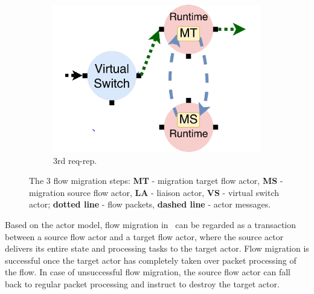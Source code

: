\begin{figure}[!t]
  \begin{subfigure}[t]{0.33\linewidth}
 \centering
   \includegraphics[width=1.1\columnwidth]{figure/nfactor-mig3.pdf}
   \caption{3rd req-rep.}\label{fig:mig3} \end{subfigure}\hfill
 \caption{The 3 flow migration steps: \textbf{MT} - migration target flow actor, \textbf{MS} - migration source flow actor, \textbf{LA} - liaison actor, \textbf{VS} - virtual switch actor; \textbf{dotted line} - flow packets, \textbf{dashed line} - actor messages.}
\label{fig:mig}
\end{figure}

Based on the actor model, flow migration in \nfactor~can be regarded as a transaction between a source flow actor and a target flow actor, where the source actor delivers its entire state and processing tasks to the target actor. Flow migration is successful once the target actor has completely taken over packet processing of the flow. %
 In case of unsuccessful flow migration, the source flow actor can fall back to regular packet processing and instruct to destroy the target actor.

